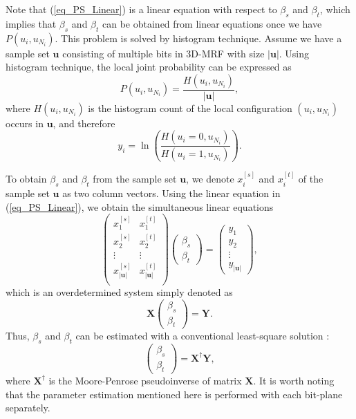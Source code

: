 \documentclass[10pt,twocolumn,twoside]{IEEEtran}
\begin{document}
Note that (\ref{eq_PS_Linear}) is a linear equation with respect to $\beta_s$ and $\beta_t$, which implies that $\beta_s$ and $\beta_t$ can be obtained from linear equations once we have  $P(u_i,u_{N_i})$. This problem is solved by histogram technique. Assume we have a sample set $\mathbf{u}$ consisting of multiple bits in 3D-MRF with size $|\mathbf{u}|$. Using histogram technique, the local joint probability can be expressed as
\begin{equation}
P(u_i, u_{N_i}) = \frac{H(u_i, u_{N_i})}{|\mathbf{u}|},
\end{equation}
where $H(u_i, u_{N_i})$ is the histogram count of the local configuration $(u_i, u_{N_i})$ occurs in $\mathbf{u}$, and therefore
\begin{equation}
y_i =  \ln(\frac{H(u_i = 0, u_{N_i})}{H(u_i = 1, u_{N_i})}).
\end{equation}

To obtain $\beta_s$ and $\beta_t$ from the sample set $\mathbf{u}$, we denote $x_i^{[s]}$ and $x_i^{[t]}$ of the sample set $\mathbf{u}$ as two column vectors. Using the linear equation in (\ref{eq_PS_Linear}), we obtain the simultaneous linear equations  
\begin{equation}
\begin{pmatrix}
x_1^{[s]} & x_1^{[t]} \\
x_2^{[s]} & x_2^{[t]} \\
\vdots & \vdots \\
x_{|\mathbf{u}|}^{[s]} & x_{|\mathbf{u}|}^{[t]} \\
\end{pmatrix}
\begin{pmatrix}
\beta_s \\
\beta_t
\end{pmatrix}
=
\begin{pmatrix}
y_1 \\
y_2 \\
\vdots \\
y_{|\mathbf{u}|}
\end{pmatrix},
\end{equation}
which is an overdetermined system simply denoted as
\begin{equation}
\mathbf{X}
\begin{pmatrix}
\beta_s \\
\beta_t
\end{pmatrix}
 = \mathbf{Y}.
\end{equation}
Thus, $\beta_s$ and $\beta_t$ can be estimated with a conventional least-square solution :
\begin{equation}
\begin{pmatrix}
\beta_s \\
\beta_t
\end{pmatrix}
= \mathbf{X}^{\dagger}\mathbf{Y},
\label{eq_beta_est}
\end{equation}
where $\mathbf{X}^{\dagger}$ is the Moore-Penrose pseudoinverse of matrix $\mathbf{X}$. It is worth noting that the parameter estimation mentioned here is performed with each bit-plane separately. 
\end{document}

